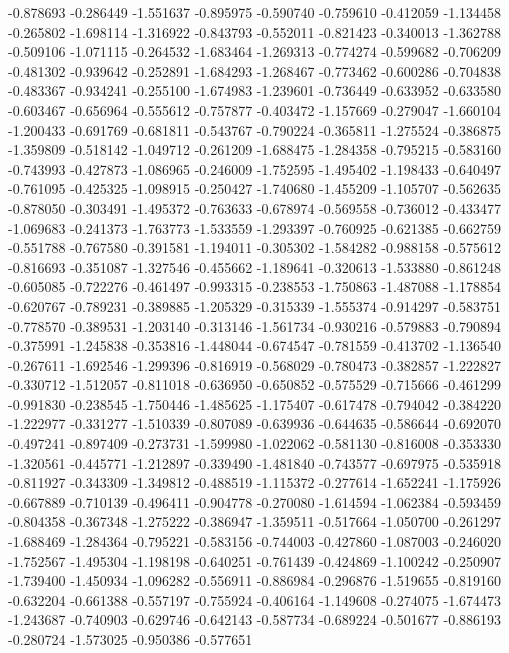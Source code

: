 -0.878693
-0.286449
-1.551637
-0.895975
-0.590740
-0.759610
-0.412059
-1.134458
-0.265802
-1.698114
-1.316922
-0.843793
-0.552011
-0.821423
-0.340013
-1.362788
-0.509106
-1.071115
-0.264532
-1.683464
-1.269313
-0.774274
-0.599682
-0.706209
-0.481302
-0.939642
-0.252891
-1.684293
-1.268467
-0.773462
-0.600286
-0.704838
-0.483367
-0.934241
-0.255100
-1.674983
-1.239601
-0.736449
-0.633952
-0.633580
-0.603467
-0.656964
-0.555612
-0.757877
-0.403472
-1.157669
-0.279047
-1.660104
-1.200433
-0.691769
-0.681811
-0.543767
-0.790224
-0.365811
-1.275524
-0.386875
-1.359809
-0.518142
-1.049712
-0.261209
-1.688475
-1.284358
-0.795215
-0.583160
-0.743993
-0.427873
-1.086965
-0.246009
-1.752595
-1.495402
-1.198433
-0.640497
-0.761095
-0.425325
-1.098915
-0.250427
-1.740680
-1.455209
-1.105707
-0.562635
-0.878050
-0.303491
-1.495372
-0.763633
-0.678974
-0.569558
-0.736012
-0.433477
-1.069683
-0.241373
-1.763773
-1.533559
-1.293397
-0.760925
-0.621385
-0.662759
-0.551788
-0.767580
-0.391581
-1.194011
-0.305302
-1.584282
-0.988158
-0.575612
-0.816693
-0.351087
-1.327546
-0.455662
-1.189641
-0.320613
-1.533880
-0.861248
-0.605085
-0.722276
-0.461497
-0.993315
-0.238553
-1.750863
-1.487088
-1.178854
-0.620767
-0.789231
-0.389885
-1.205329
-0.315339
-1.555374
-0.914297
-0.583751
-0.778570
-0.389531
-1.203140
-0.313146
-1.561734
-0.930216
-0.579883
-0.790894
-0.375991
-1.245838
-0.353816
-1.448044
-0.674547
-0.781559
-0.413702
-1.136540
-0.267611
-1.692546
-1.299396
-0.816919
-0.568029
-0.780473
-0.382857
-1.222827
-0.330712
-1.512057
-0.811018
-0.636950
-0.650852
-0.575529
-0.715666
-0.461299
-0.991830
-0.238545
-1.750446
-1.485625
-1.175407
-0.617478
-0.794042
-0.384220
-1.222977
-0.331277
-1.510339
-0.807089
-0.639936
-0.644635
-0.586644
-0.692070
-0.497241
-0.897409
-0.273731
-1.599980
-1.022062
-0.581130
-0.816008
-0.353330
-1.320561
-0.445771
-1.212897
-0.339490
-1.481840
-0.743577
-0.697975
-0.535918
-0.811927
-0.343309
-1.349812
-0.488519
-1.115372
-0.277614
-1.652241
-1.175926
-0.667889
-0.710139
-0.496411
-0.904778
-0.270080
-1.614594
-1.062384
-0.593459
-0.804358
-0.367348
-1.275222
-0.386947
-1.359511
-0.517664
-1.050700
-0.261297
-1.688469
-1.284364
-0.795221
-0.583156
-0.744003
-0.427860
-1.087003
-0.246020
-1.752567
-1.495304
-1.198198
-0.640251
-0.761439
-0.424869
-1.100242
-0.250907
-1.739400
-1.450934
-1.096282
-0.556911
-0.886984
-0.296876
-1.519655
-0.819160
-0.632204
-0.661388
-0.557197
-0.755924
-0.406164
-1.149608
-0.274075
-1.674473
-1.243687
-0.740903
-0.629746
-0.642143
-0.587734
-0.689224
-0.501677
-0.886193
-0.280724
-1.573025
-0.950386
-0.577651
